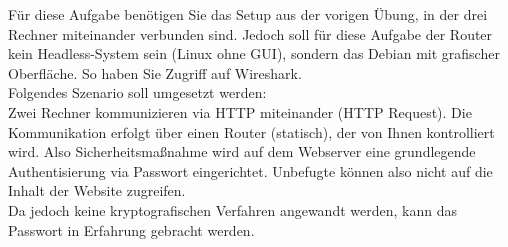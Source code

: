 \documentclass[paper=a4,fontsize=11pt]{scrartcl}%
\begin{document}
Für diese Aufgabe benötigen Sie das Setup aus der vorigen Übung, in der drei Rechner miteinander verbunden sind. Jedoch soll für diese Aufgabe der Router kein Headless-System sein (Linux ohne GUI), sondern das Debian mit grafischer Oberfläche. So haben Sie Zugriff auf Wireshark.\\
Folgendes Szenario soll umgesetzt werden:\\
Zwei Rechner kommunizieren via HTTP miteinander (HTTP Request). Die Kommunikation erfolgt über einen Router (statisch), der von Ihnen kontrolliert wird. Also Sicherheitsmaßnahme wird auf dem Webserver eine grundlegende Authentisierung via Passwort eingerichtet. Unbefugte können also nicht auf die Inhalt der Website zugreifen.\\
Da jedoch keine kryptografischen Verfahren angewandt werden, kann das Passwort in Erfahrung gebracht werden.
\end{document}
